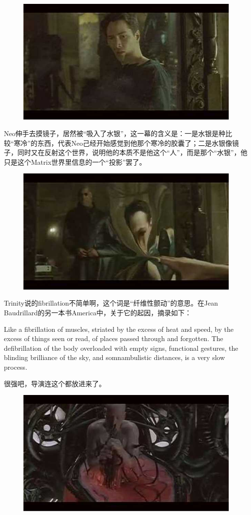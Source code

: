\documentclass{ctexart}
\begin{document}
\begin{figure}[htb]
\centering
\includegraphics[width=0.5\linewidth]{fig/read_Matrix-20}
\end{figure}

Neo伸手去摸镜子，居然被“吸入了水银”，这一幕的含义是：一是水银是种比较“寒冷”的东西，代表Neo己经开始感觉到他那个寒冷的胶囊了；二是水银像镜子，同时又在反射这个世界，说明他的本质不是他这个“人”，而是那个“水银”，他只是这个Matrix世界里信息的一个“投影”罢了。

\begin{figure}[htb]
\centering
\includegraphics[width=0.5\linewidth]{fig/read_Matrix-21}
\end{figure}

Trinity说的fibrillation不简单啊，这个词是“纤维性颤动”的意思。在Jean Baudrillard的另一本书America中，关于它的起因，摘录如下：

Like a fibrillation of muscles, striated by the excess of heat and speed, by the excess of things seen or read, of places passed through and forgotten. The defibrillation of the body overloaded with empty signs, functional gestures, the blinding brilliance of the sky, and somnambulistic distances, is a very slow process.

很强吧，导演连这个都放进来了。

\begin{figure}[htb]
\centering
\includegraphics[width=0.5\linewidth]{fig/read_Matrix-22}
\end{figure}
\end{document}
